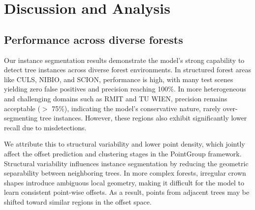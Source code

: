 \documentclass[review,authoryear]{elsarticle}
\begin{document}

\section{Discussion and Analysis}
\label{sec:discussion}

\subsection{Performance across diverse forests}
Our instance segmentation results demonstrate the model's strong capability to detect tree instances across diverse forest environments. In structured forest areas like CULS, NIBIO, and SCION, performance is high, with many test scenes yielding zero false positives and precision reaching 100\%. In more heterogeneous and challenging domains such as RMIT and TU WIEN, precision remains acceptable ($>$ 75\%), indicating the model's conservative nature, rarely over-segmenting tree instances. However, these regions also exhibit significantly lower recall due to misdetections. 

We attribute this to structural variability and lower point density, which jointly affect the offset prediction and clustering stages in the PointGroup framework. Structural variability influences instance segmentation by reducing the geometric separability between neighboring trees. In more complex forests, irregular crown shapes introduce ambiguous local geometry, making it difficult for the model to learn consistent point-wise offsets. As a result, points from adjacent trees may be shifted toward similar regions in the offset space.
\end{document}
